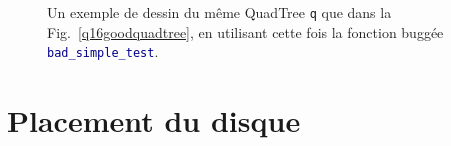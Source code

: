 \documentclass[11pt]{scrartcl}
\newcommand{\funname}[1]{\texttt{\textcolor{darkblue}{#1}}}
\newcommand{\code}[1]{\texttt{#1}}
\begin{document}
\begin{description}
\begin{figure}[!h]
	\centering
	\caption{\label{q16badquadtree} Un exemple de dessin du même QuadTree \code{q} que dans la Fig.~\ref{q16goodquadtree}, en utilisant cette fois la fonction buggée \funname{bad_simple_test}.}
\end{figure}

\clearpage

\end{description}

\section{Placement du disque}
\end{document}
